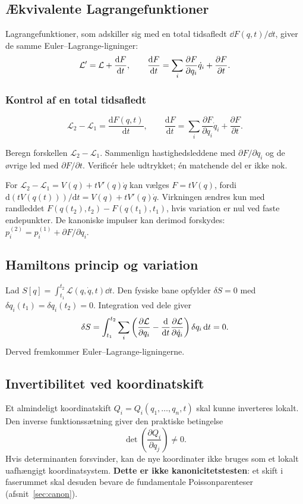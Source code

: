 \subsection{Ækvivalente Lagrangefunktioner}
Lagrangefunktioner, som adskiller sig med en total tidsafledt $\dd F(q,t)/\dd t$, giver de samme Euler--Lagrange-ligninger:
\[\mathcal L'=\mathcal L+\frac{\mathrm d F}{\mathrm d t},\qquad \frac{\mathrm d F}{\mathrm d t}=\sum_i\frac{\partial F}{\partial q_i}\dot q_i+\frac{\partial F}{\partial t}.\]

\subsubsection*{Kontrol af en total tidsafledt}
\[\boxed{\mathcal L_2-\mathcal L_1=\frac{\mathrm dF(q,t)}{\mathrm dt},\qquad \frac{\mathrm dF}{\mathrm dt}=\sum_i\frac{\partial F}{\partial q_i}\dot q_i+\frac{\partial F}{\partial t}.}\]
\begin{method}Beregn forskellen $\mathcal L_2-\mathcal L_1$. Sammenlign hastighedsleddene med $\partial F/\partial q_i$ og de øvrige led med $\partial F/\partial t$. Verificér hele udtrykket; én matchende del er ikke nok.\end{method}
For $\mathcal L_2-\mathcal L_1=V(q)+tV'(q)\dot q$ kan vælges $F=tV(q)$, fordi $\mathrm d(tV(q(t)))/\mathrm dt=V(q)+tV'(q)\dot q$. Virkningen ændres kun med randleddet $F(q(t_2),t_2)-F(q(t_1),t_1)$, hvis variation er nul ved faste endepunkter. De kanoniske impulser kan derimod forskydes: $p_i^{(2)}=p_i^{(1)}+\partial F/\partial q_i$.

\subsection{Hamiltons princip og variation}
Lad $S[q]=\int_{t_1}^{t_2}\mathcal L(q,\dot q,t)\dd t$. Den fysiske bane opfylder $\delta S=0$ med $\delta q_i(t_1)=\delta q_i(t_2)=0$. Integration ved dele giver
\[\delta S=\int_{t_1}^{t_2}\sum_i\left(\frac{\partial \mathcal L}{\partial q_i}-\frac{\mathrm d }{\mathrm d t}\frac{\partial \mathcal L}{\partial \dot q_i}\right)\delta q_i\,\mathrm d t=0.\]
Derved fremkommer Euler--Lagrange-ligningerne.

\subsection{Invertibilitet ved koordinatskift}
Et almindeligt koordinatskift $Q_i=Q_i(q_1,\ldots,q_n,t)$ skal kunne inverteres lokalt. Den inverse funktionssætning giver den praktiske betingelse
\[\boxed{\det\left(\frac{\partial Q_i}{\partial q_j}\right)\neq0.}\]
Hvis determinanten forsvinder, kan de nye koordinater ikke bruges som et lokalt uafhængigt koordinatsystem. \textbf{Dette er ikke kanonicitetstesten}: et skift i faserummet skal desuden bevare de fundamentale Poissonparenteser (afsnit~\ref{sec:canon}).

